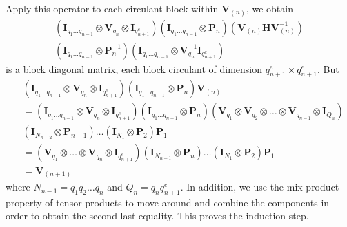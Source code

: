 \begin{ext_proof}
    Apply this operator to each circulant block within \(\bm{V}_{(n)}\), we obtain
    \begin{multline*}
        \left(\bm{I}_{q_1\ldots q_{n-1}} \otimes \bm{V}_{q_n} \otimes \bm{I}_{q_{n+1}^e}\right) \left(\bm{I}_{q_1\ldots q_{n-1}} \otimes \bm{P}_n\right) \left(\bm{V}_{(n)} \bm{H} \bm{V}_{(n)}^{-1}\right) \\
        \left(\bm{I}_{q_1\ldots q_{n-1}} \otimes \bm{P}_n^{-1}\right) \left(\bm{I}_{q_1\ldots q_{n-1}} \otimes \bm{V}_{q_n}^{-1} \bm{I}_{q_{n+1}^e}\right)
    \end{multline*}
    is a block diagonal matrix, each block circulant of dimension \(q_{n+1}^e \times q_{n+1}^e\). But
    \begin{align*}
        &\left(\bm{I}_{q_1\ldots q_{n-1}} \otimes \bm{V}_{q_n} \otimes \bm{I}_{q_{n+1}^e}\right) \left(\bm{I}_{q_1\ldots q_{n-1}} \otimes \bm{P}_n\right) \bm{V}_{(n)} \\
        &= \left(\bm{I}_{q_1\ldots q_{n-1}} \otimes \bm{V}_{q_n} \otimes \bm{I}_{q_{n+1}^e}\right) \left(\bm{I}_{q_1\ldots q_{n-1}} \otimes \bm{P}_n\right) \left(\bm{V}_{q_1} \otimes \bm{V}_{q_2} \otimes \ldots \otimes \bm{V}_{q_{n-1}} \otimes \bm{I}_{Q_n}\right) \\
        &\left(\bm{I}_{N_{n-2}} \otimes \bm{P}_{n-1}\right) \dots \left(\bm{I}_{N_1} \otimes \bm{P}_2\right) \bm{P}_1 \\
        &= \left(\bm{V}_{q_1} \otimes \ldots \otimes \bm{V}_{q_{n}} \otimes \bm{I}_{q_{n+1}^e}\right) \left(\bm{I}_{N_{n-1}} \otimes \bm{P}_n\right) \dots \left(\bm{I}_{N_1} \otimes \bm{P}_2\right) \bm{P}_1 \\
        &= \bm{V}_{(n+1)}
    \end{align*}
    where \(N_{n-1} = q_1 q_2 \ldots q_n\) and \(Q_n = q_n q_{n+1}^e\). In addition, we use the mix product property of tensor products to move around and combine the components in order to obtain the second last equality. This proves the induction step.
\end{ext_proof}